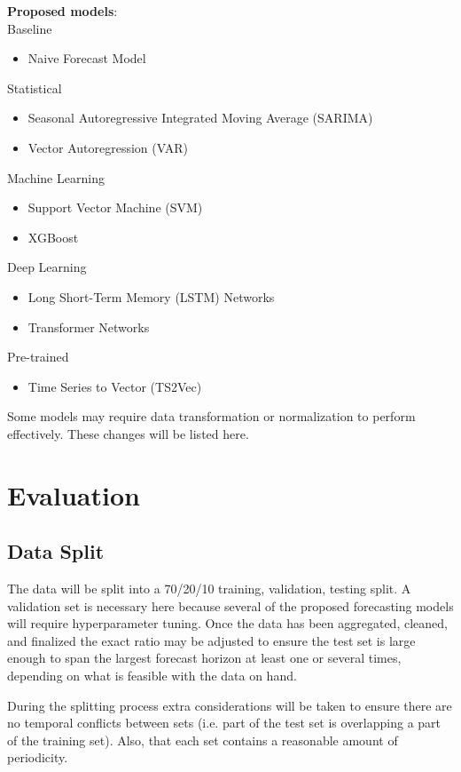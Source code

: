 \documentclass[sigconf]{acmart}
\begin{document}
\textbf{Proposed models}:
\\
Baseline
\begin{itemize}
    \item{Naive Forecast Model}
\end{itemize}
Statistical
\begin{itemize}
    \item{Seasonal Autoregressive Integrated Moving Average (SARIMA)}
    \item{Vector Autoregression (VAR)}
\end{itemize}
Machine Learning
\begin{itemize}
    \item{Support Vector Machine (SVM)}
    \item{XGBoost}
\end{itemize}
Deep Learning
\begin{itemize}
    \item{Long Short-Term Memory (LSTM) Networks}
    \item{Transformer Networks}
\end{itemize}
Pre-trained
\begin{itemize}
    \item{Time Series to Vector (TS2Vec)}
\end{itemize}

Some models may require data transformation or normalization to perform effectively. These changes will be listed here.

\section{Evaluation}

\subsection{Data Split}
The data will be split into a 70/20/10 training, validation, testing split. A validation set is necessary here because several of the proposed forecasting models will require hyperparameter tuning. Once the data has been aggregated, cleaned, and finalized the exact ratio may be adjusted to ensure the test set is large enough to span the largest forecast horizon at least one or several times, depending on what is feasible with the data on hand.

During the splitting process extra considerations will be taken to ensure there are no temporal conflicts between sets (i.e. part of the test set is overlapping a part of the training set). Also, that each set contains a reasonable amount of periodicity. 
\end{document}
